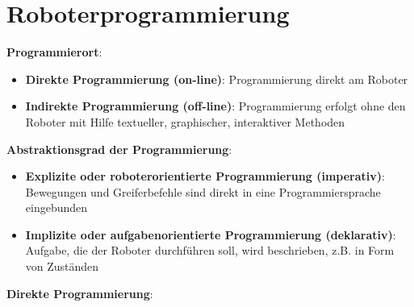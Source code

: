 \section{Roboterprogrammierung}

\textbf{Programmierort}:
\begin{itemize}
	\item \textbf{Direkte Programmierung (on-line)}: Programmierung direkt am Roboter
	\item \textbf{Indirekte Programmierung (off-line)}: Programmierung erfolgt ohne den Roboter mit Hilfe textueller, graphischer, interaktiver Methoden
\end{itemize}
\bigskip
\textbf{Abstraktionsgrad der Programmierung}:
\begin{itemize}
	\item \textbf{Explizite oder roboterorientierte Programmierung (imperativ)}: Bewegungen und Greiferbefehle sind direkt in eine Programmiersprache eingebunden
	\item \textbf{Implizite oder aufgabenorientierte Programmierung (deklarativ)}: Aufgabe, die der Roboter durchführen soll, wird beschrieben, z.B. in Form von Zuständen
\end{itemize}
\bigskip
\textbf{Direkte Programmierung}:
